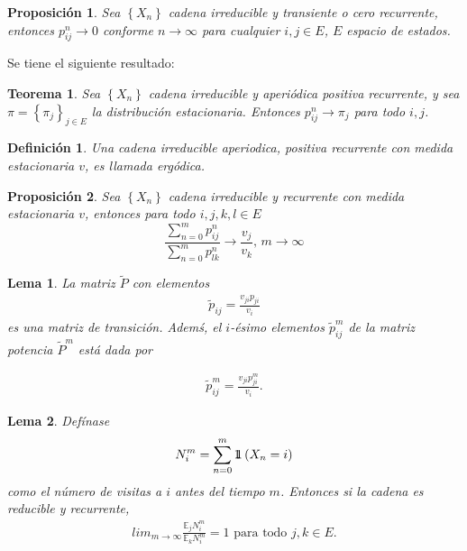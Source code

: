 \documentclass{article}
\newtheorem{Def}{Definición}[section]
\newtheorem{Teo}{Teorema}[section]
\newtheorem{Prop}{Proposición}[section]
\newtheorem{Lema}{Lema}[section]
\newcommand{\esp}{\mathbb{E}}
\newcommand{\indora}{\mbox{$1$\hspace{-0.8ex}$1$}}
\numberwithin{equation}{section}
\begin{document}
\begin{Prop}
Sea $\left\{X_{n}\right\}$ cadena irreducible y transiente o cero recurrente, entonces $p_{ij}^{n}\rightarrow0$ conforme $n\rightarrow\infty$ para cualquier $i,j\in E$, $E$ espacio de estados.
\end{Prop}

Se tiene el siguiente resultado:

\begin{Teo}
Sea $\left\{X_{n}\right\}$ cadena irreducible y aperi\'odica positiva recurrente, y sea $\pi=\left\{\pi_{j}\right\}_{j\in E}$ la distribuci\'on estacionaria. Entonces $p_{ij}^{n}\rightarrow\pi_{j}$ para todo $i,j$.
\end{Teo}

\begin{Def}\label{Def.Ergodicidad}
Una cadena irreducible aperiodica, positiva recurrente con medida estacionaria $v$, es llamada {\em erg\'odica}.
\end{Def}

\begin{Prop}\label{Prop.4.4}
Sea $\left\{X_{n}\right\}$ cadena irreducible y recurrente con medida estacionaria $v$, entonces para todo $i,j,k,l\in E$
\begin{equation}
\frac{\sum_{n=0}^{m}p_{ij}^{n}}{\sum_{n=0}^{m}p_{lk}^{n}}\rightarrow\frac{v_{j}}{v_{k}}\textrm{,    }m\rightarrow\infty
\end{equation}
\end{Prop}

\begin{Lema}\label{Lema.4.5}
La matriz $\widetilde{P}$ con elementos 
\begin{eqnarray}
\widetilde{p}_{ij}=\frac{v_{ji}p_{ji}}{v_{i}}
\end{eqnarray}
es una matriz de transici\'on. Adem\'s, el $i$-\'esimo elementos $\widetilde{p}_{ij}^{m}$ de la matriz potencia $\widetilde{P}^{m}$ est\'a dada por 

\begin{eqnarray}
\widetilde{p}_{ij}^{m}=\frac{v_{ji}p_{ji}^{m}}{v_{i}}.
\end{eqnarray}
\end{Lema}

\begin{Lema}
Def\'inase 
\begin{eqnarray}
N_{i}^{m}=\sum_{n=0}^{m}\indora\left(X_{n}=i\right)
\end{eqnarray} 
como el n\'umero de visitas a $i$ antes del tiempo $m$. Entonces si la cadena es reducible y recurrente, 
\begin{eqnarray}
lim_{m\rightarrow\infty}\frac{\esp_{j}N_{i}^{m}}{\esp_{k}N_{i}^{m}}=1\textrm{ para todo }j,k\in E.
\end{eqnarray}
\end{Lema}
\end{document}
